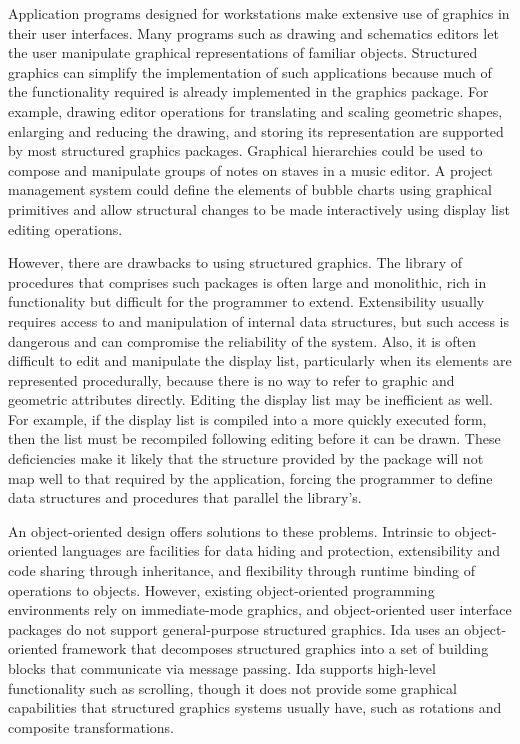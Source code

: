Application programs designed for workstations make extensive use of
graphics in their user interfaces.  Many programs such as drawing and
schematics editors let the user manipulate graphical representations of
familiar objects.  Structured graphics can simplify the implementation of
such applications because much of the functionality required is already
implemented in the graphics package.  For example, drawing editor operations
for translating and scaling geometric shapes, enlarging and reducing the
drawing, and storing its representation are supported by most structured
graphics packages.
Graphical hierarchies could be used to compose and manipulate groups of notes
on staves in a music editor.  A project management system could define the
elements of bubble charts using graphical primitives and allow
structural changes to be made interactively using display list editing
operations.

However, there are drawbacks to using structured graphics.  The
library of procedures that comprises such packages is often large and
monolithic, rich in functionality but difficult for the programmer to
extend.  Extensibility usually requires access to and manipulation of
internal data structures, but such access is dangerous and can compromise
the reliability of the system.  Also, it is often difficult to edit and
manipulate the display list, particularly when its elements are represented
procedurally, because there is no way to refer to graphic and geometric
attributes directly.  Editing the display list may be inefficient as well.
For example, if the display list is compiled into a more quickly executed
form, then the list must be recompiled following editing before it can be
drawn.  These deficiencies make it likely that the structure provided by the
package will not map well to that required by the application, forcing the
programmer to define data structures and procedures that parallel the
library's.

An object-oriented design offers solutions to these problems.  Intrinsic to
object-oriented languages are facilities for data hiding and protection,
extensibility and code sharing through inheritance, and flexibility through
runtime binding of operations to objects.  However, existing object-oriented
programming environments \cite{st:pe,trellis:pe} rely on
immediate-mode graphics, and object-oriented user interface packages
\cite{grow,macapp} do not support general-purpose structured
graphics.  Ida \cite{ida} uses an object-oriented framework that decomposes
structured graphics into a set of building blocks that communicate via
message passing.  Ida supports high-level functionality such as scrolling,
though it does not provide some graphical capabilities that structured
graphics systems usually have, such as rotations and composite
transformations.

